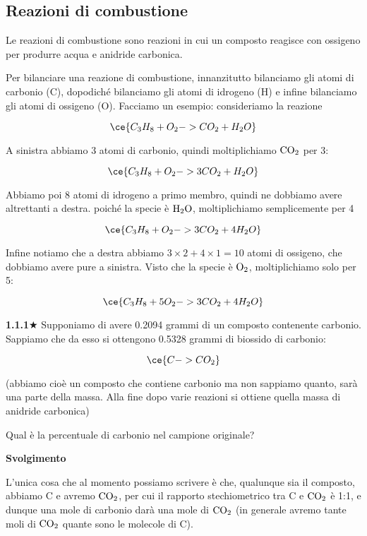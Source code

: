 \subsection{Reazioni di combustione}
Le reazioni di combustione sono reazioni in cui un composto reagisce con ossigeno per produrre acqua e anidride carbonica.

Per bilanciare una reazione di combustione, innanzitutto bilanciamo gli atomi di carbonio (C), dopodiché bilanciamo gli atomi di idrogeno (H) e infine bilanciamo gli atomi di ossigeno (O). Facciamo un esempio: consideriamo la reazione

$$\ce{C_3H_8 + O_2 -> CO_2 + H_2O}$$

A sinistra abbiamo 3 atomi di carbonio, quindi moltiplichiamo $\rm CO_2$ per 3:

$$\ce{C_3H_8 + O_2 -> 3CO_2 + H_2O}$$

Abbiamo poi 8 atomi di idrogeno a primo membro, quindi ne dobbiamo avere altrettanti a destra. poiché la specie è $\rm H_2O$, moltiplichiamo semplicemente per 4

$$\ce{C_3H_8 + O_2 -> 3CO_2 + 4H_2O}$$

Infine notiamo che a destra abbiamo $3 \times 2 + 4 \times 1=10$ atomi di ossigeno, che dobbiamo avere pure a sinistra. Visto che la specie è $\rm O_2$, moltiplichiamo solo per 5:

$$\ce{C_3H_8 + 5O_2 -> 3CO_2 + 4H_2O}$$

\vspace{0.2cm}\textbf{1.1.1}$\bigstar$ Supponiamo di avere 0.2094 grammi di un composto contenente carbonio. Sappiamo che da esso si ottengono 0.5328 grammi di biossido di carbonio:

$$\ce{C -> CO_2}$$

(abbiamo cioè un composto che contiene carbonio ma non sappiamo quanto, sarà una parte della massa. Alla fine dopo varie reazioni si ottiene quella massa di anidride carbonica)

Qual è la percentuale di carbonio nel campione originale?

\vspace{0.2cm}\large\textbf{Svolgimento}\normalsize

\vspace{0.2cm}L'unica cosa che al momento possiamo scrivere è che, qualunque sia il composto, abbiamo C e avremo $\rm CO_2$, per cui il rapporto stechiometrico tra C e $\rm CO_2$ è 1:1, e dunque una mole di carbonio darà una mole di $\rm CO_2$ (in generale avremo tante moli di $\rm CO_2$ quante sono le molecole di C).

